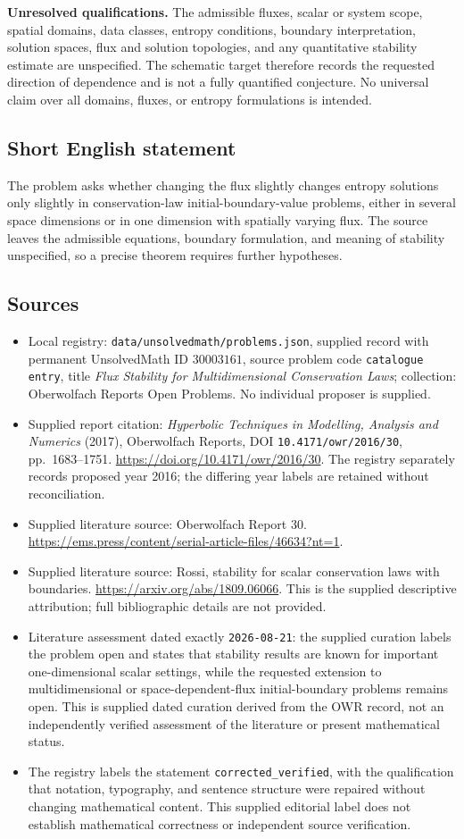\documentclass[11pt]{article}
\begin{document}
\textbf{Unresolved qualifications.} The admissible fluxes, scalar or system scope, spatial domains, data classes, entropy conditions, boundary interpretation, solution spaces, flux and solution topologies, and any quantitative stability estimate are unspecified. The schematic target therefore records the requested direction of dependence and is not a fully quantified conjecture. No universal claim over all domains, fluxes, or entropy formulations is intended.
\subsection{Short English statement}
The problem asks whether changing the flux slightly changes entropy solutions only slightly in conservation-law initial-boundary-value problems, either in several space dimensions or in one dimension with spatially varying flux. The source leaves the admissible equations, boundary formulation, and meaning of stability unspecified, so a precise theorem requires further hypotheses.
\subsection{Sources}
\begin{itemize}
\item Local registry: \texttt{data/unsolvedmath/problems.json}, supplied record with permanent UnsolvedMath ID \(30003161\), source problem code \texttt{catalogue entry}, title \emph{Flux Stability for Multidimensional Conservation Laws}; collection: Oberwolfach Reports Open Problems. No individual proposer is supplied.
\item Supplied report citation: \emph{Hyperbolic Techniques in Modelling, Analysis and Numerics} (2017), Oberwolfach Reports, DOI \texttt{10.4171/owr/2016/30}, pp.~1683--1751. \url{https://doi.org/10.4171/owr/2016/30}. The registry separately records proposed year 2016; the differing year labels are retained without reconciliation.
\item Supplied literature source: Oberwolfach Report 30. \url{https://ems.press/content/serial-article-files/46634?nt=1}.
\item Supplied literature source: Rossi, stability for scalar conservation laws with boundaries. \url{https://arxiv.org/abs/1809.06066}. This is the supplied descriptive attribution; full bibliographic details are not provided.
\item Literature assessment dated exactly \texttt{2026-08-21}: the supplied curation labels the problem open and states that stability results are known for important one-dimensional scalar settings, while the requested extension to multidimensional or space-dependent-flux initial-boundary problems remains open. This is supplied dated curation derived from the OWR record, not an independently verified assessment of the literature or present mathematical status.
\item The registry labels the statement \texttt{corrected\_verified}, with the qualification that notation, typography, and sentence structure were repaired without changing mathematical content. This supplied editorial label does not establish mathematical correctness or independent source verification.
\end{itemize}
\end{document}
